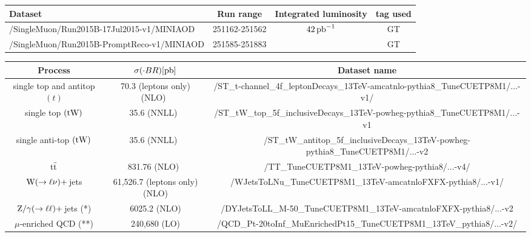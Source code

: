 \begin{sidewaystable}[h!]
\caption{Data samples.~\cite{sd}.}
\label{tab:data}
\centering
\begin{tabular}{ |l|c|c|c| }
  \hline
  Dataset & Run range &  Integrated luminosity & tag used \\
  \hline
  \hline
\small{/SingleMuon/Run2015B-17Jul2015-v1/MINIAOD} & 251162-251562 & \multirow{ 2}{*}{$42\,{\rm pb}^{-1}$} & GT \\
\small{/SingleMuon/Run2015B-PromptReco-v1/MINIAOD} & 251585-251883 &  & GT \\
  \hline
\end{tabular}
\vspace{1cm}
\caption{Monte Carlo datasets used in this analysis. 
The samples are generated either inclusively or with a final state restricted to the leptonic mode,
including electrons, muons, and taus. Where no references are given, the cross sections come from 
the generator itself. For the samples restricted to specific decay channels the branching ratio (BR) is included in the cross section value quoted. The "RunIISpring15DR74-Asympt50ns\_MCRUN2\_74\_V9A" part in the name is the same for all samples and has been replaced by "...".} 
\label{tab:samples}
\centering
\begin{tabular}{|c||c|c|}
                        \hline
    			Process        & $\sigma(\cdot BR)[{\rm pb}]$  & Dataset name \\
    			\hline \hline
    			single top and antitop $(t)$ & 70.3 (leptons only) (NLO)~\cite{tchanxsec}  & \small{/ST\_t-channel\_4f\_leptonDecays\_13TeV-amcatnlo-pythia8\_TuneCUETP8M1/...-v1/}\\
    			single top $(\rm tW)$ &35.6 (NNLL)~\cite{Kidonakis:2012db} & \small{/ST\_tW\_top\_5f\_inclusiveDecays\_13TeV-powheg-pythia8\_TuneCUETP8M1/...-v1}\\
    			single anti-top $(\rm tW)$ &35.6 (NNLL)~\cite{Kidonakis:2012db} & \small{/ST\_tW\_antitop\_5f\_inclusiveDecays\_13TeV-powheg-pythia8\_TuneCUETP8M1/...-v2}\\
			\hline
    			$\mathrm{t}\bar{\mathrm{t}}$       & 831.76 (NLO)~\cite{tchanxsec} & \small{/TT\_TuneCUETP8M1\_13TeV-powheg-pythia8/...-v4/} \\ 
                ${\rm W}(\to \ell\nu)+$\,jets      &     61,526.7 (leptons only) (NLO) & \small{/WJetsToLNu\_TuneCUETP8M1\_13TeV-amcatnloFXFX-pythia8/...-v1/}\\
                ${\rm Z}/\gamma(\to \ell\ell)+$\,jets  (*)    &     6025.2 (NLO) & \small{/DYJetsToLL\_M-50\_TuneCUETP8M1\_13TeV-amcatnloFXFX-pythia8/...-v2}\\
			$\mu$-enriched QCD (**)                &240,680  (LO) & \small{/QCD\_Pt-20toInf\_MuEnrichedPt15\_TuneCUETP8M1\_13TeV\_pythia8/...-v2/}\\
			\hline
    		  	\end{tabular}


\end{sidewaystable}
